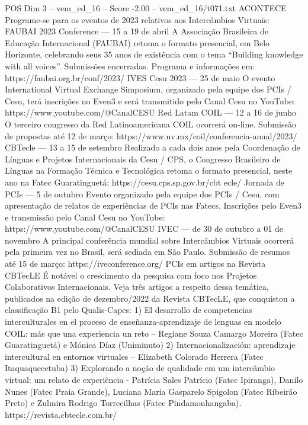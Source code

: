 \begin{textsample}{POS Dim 3 – vem\_ed\_16 – Score -2.00 – vem\_ed\_16/t071.txt}  \label{ex:f3_pos_084}
ACONTECE Programe-se para os eventos de 2023 relativos aos Intercâmbios Virtuais: FAUBAI 2023 Conference — 15 a 19 de abril A Associação Brasileira de Educação Internacional (FAUBAI) retoma o formato presencial, em Belo Horizonte, celebrando seus 35 anos de existência com o tema “Building knowledge with all voices”.
Submissões encerradas.
Programa e informações em: https://faubai.org.br/conf/2023/ IVES Cesu 2023 — 25 de maio O evento International Virtual Exchange Simposium, organizado pela equipe dos PCIs / Cesu, terá inscrições no Even3 e será transmitido pelo Canal Cesu no YouTube: https://www.youtube.com/@CanalCESU Red Latam COIL — 12 a 16 de junho O terceiro congresso da Red Latinoamericana COIL ocorrerá on-line.
Submissão de propostas até 12 de março: https://www.uv.mx/coil/conferencia-anual/2023/ CBTecle — 13 a 15 de setembro Realizado a cada dois anos pela Coordenação de Línguas e Projetos Internacionais da Cesu / CPS, o Congresso Brasileiro de Línguas na Formação Técnica e Tecnológica retoma o formato presencial, neste ano na Fatec Guaratinguetá: https://cesu.cps.sp.gov.br/cbt ecle/ Jornada de PCIs — 5 de outubro Evento organizado pela equipe dos PCIs / Cesu, com apresentação de relatos de experiências de PCIs nas Fatecs.
Inscrições pelo Even3 e transmissão pelo Canal Cesu no YouTube: https://www.youtube.com/@CanalCESU IVEC — de 30 de outubro a 01 de novembro A principal conferência mundial sobre Intercâmbios Virtuais ocorrerá pela primeira vez no Brasil, será sediada em São Paulo.
Submissão de resumos até 15 de março: https://iveconference.org/ PCIs em artigos na Revista CBTecLE É notável o crescimento da pesquisa com foco nos Projetos Colaborativos Internacionais.
Veja três artigos a respeito dessa temática, publicados na edição de dezembro/2022 da Revista CBTecLE, que conquistou a classificação B1 pelo Qualis-Capes: 1) El desarrollo de competencias interculturales en el proceso de enseñanza-aprendizaje de lenguas en modelo COIL: más que una experiencia un reto – Regiane Souza Camargo Moreira (Fatec Guaratinguetá) e Mónica Díaz (Uniminuto) 2) Internacionalización: aprendizaje intercultural en entornos virtuales – Elizabeth Colorado Herrera (Fatec Itaquaquecetuba) 3) Explorando a noção de qualidade em um intercâmbio virtual: um relato de experiência - Patrícia Sales Patrício (Fatec Ipiranga), Danilo Nunes (Fatec Praia Grande), Luciana Maria Gasparelo Spigolon (Fatec Ribeirão Preto) e Zulmira Rodrigo Torrecilhas (Fatec Pindamonhangaba). https://revista.cbtecle.com.br/

\end{textsample}
